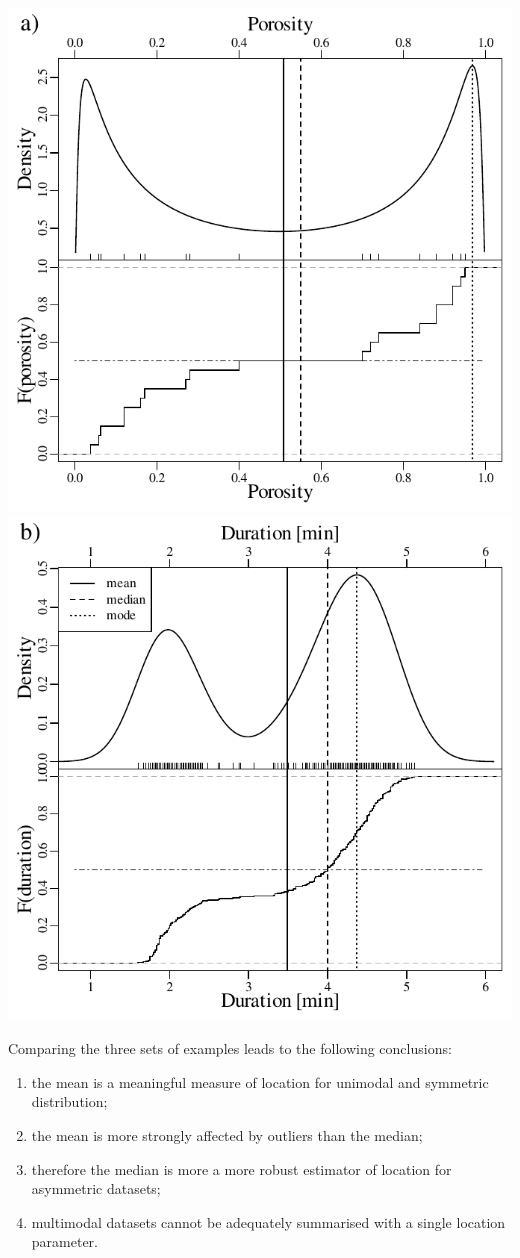 \noindent\includegraphics[width=.5\textwidth]{../figures/porositylocation.pdf}
\includegraphics[width=.5\textwidth]{../figures/eruptionslocation.pdf}
\begingroup
{}
\label{fig:porositylocation}
\endgroup

Comparing the three sets of examples leads to the following
conclusions:

\begin{enumerate}
\item the mean is a meaningful measure of location for unimodal and
  symmetric distribution;
\item the mean is more strongly affected by outliers than the median;
\item therefore the median is more a more robust estimator of location
  for asymmetric datasets;
\item multimodal datasets cannot be adequately summarised with a
  single location parameter.
\end{enumerate}

